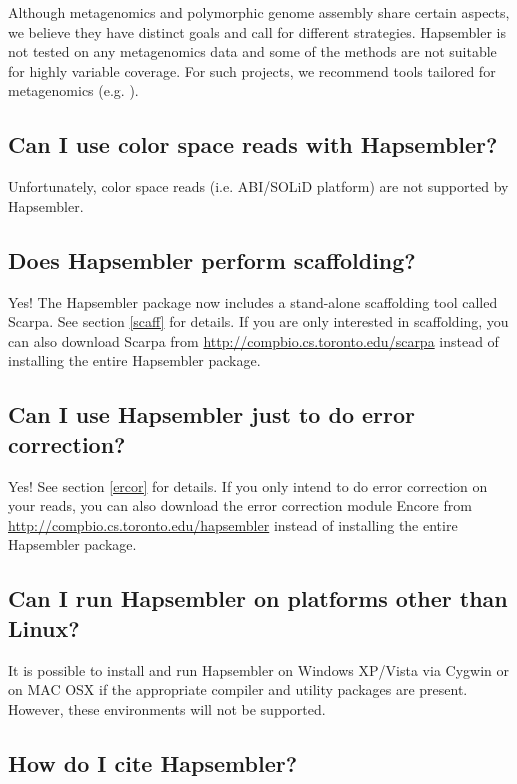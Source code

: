 \documentclass[12pt,a4paper]{report}
\begin{document}
Although metagenomics and polymorphic genome assembly share certain aspects, we believe they have distinct goals and call for different strategies. Hapsembler is not tested on any metagenomics data and some of the methods are not suitable for highly variable coverage. For such projects, we recommend tools tailored for metagenomics (e.g. \cite{laserson}).

\subsection{Can I use color space reads with Hapsembler?}

Unfortunately, color space reads (i.e. ABI/SOLiD platform) are not supported by Hapsembler.

\subsection{Does Hapsembler perform scaffolding?}

Yes! The Hapsembler package now includes a stand-alone scaffolding tool called Scarpa. See section \ref{scaff} for details. If you are only interested in scaffolding, you can also download Scarpa from \url{http://compbio.cs.toronto.edu/scarpa} instead of installing the entire Hapsembler package.

\subsection{Can I use Hapsembler just to do error correction?}

Yes! See section \ref{ercor} for details. If you only intend to do error correction on your reads, you can also download the error correction module Encore from \url{http://compbio.cs.toronto.edu/hapsembler} instead of installing the entire Hapsembler package.

\subsection{Can I run Hapsembler on platforms other than Linux?}

It is possible to install and run Hapsembler on Windows XP/Vista via Cygwin or on MAC OSX if the appropriate compiler and utility packages are present. However, these environments will not be supported.

\subsection{How do I cite Hapsembler?}
\end{document}
